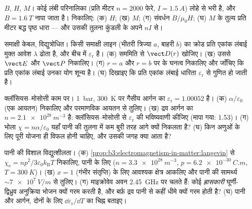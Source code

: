 \begin{exercise}[$\star$]\label{exo:b3:electromagnetism-in-matter:4}
$B$, $H$, $M$। कोई लंबी परिनालिका (प्रति मीटर $n = \num{2000}$ फेरे,
$I = \qty{1.5}{A}$) लोहे से भरी है, और $B = \qty{1.6}{T}$ नापा जाता
है। निकालिए: (क) $H$; (ख) $M$; (ग) संवर्धन
$B/\mu_0H$; (घ) $M$ के तुल्य प्रति मीटर बद्ध पृष्ठ धारा --- और उसकी
तुलना कुंडली के अपने $nI$ से।
\end{exercise}

\begin{exercise}[$\star\star$]\label{exo:b3:electromagnetism-in-matter:5}
समाक्षी केबल, विद्युत्रोधित। किसी समाक्षी लाइन (भीतरी त्रिज्या $a$,
बाहरी $b$) का क्रोड प्रति एकांक लंबाई मुक्त आवेश $\lambda$ ढोता है,
और बीच में  $\varepsilon_{\text{r}}$ है। (क) सममिति से
$\vect D(r)$ खोजिए। (ख) उससे $\vect E$ और $\vect P$ निकालिए।
(ग) $r = a$ और $r = b$ पर  के घनत्व निकालिए और
जाँचिए कि प्रति एकांक लंबाई उनका योग शून्य है। (घ) दिखाइए कि प्रति
एकांक लंबाई धारिता $\varepsilon_{\text{r}}$ से गुणित हो जाती है।
\end{exercise}

\begin{exercise}[$\star\star$]\label{exo:b3:electromagnetism-in-matter:6}
क्लॉसियस--मोसोत्ती काम पर। \qty{1}{bar}, \qty{300}{K} पर गैसीय
आर्गन का $\varepsilon_{\text{r}} = 1.00052$ है। (क)
$\alpha/\varepsilon_0$ (एक आयतन) निकालिए और परमाणविक
आयतन से तुलिए। (ख) द्रव आर्गन का $n = \qty{2.1e28}{m^{-3}}$ है:
क्लॉसियस--मोसोत्ती से $\varepsilon_{\text{r}}$ की भविष्यवाणी कीजिए
(मापा गया: 1.53)। (ग) भोला $\chi = n\alpha/\varepsilon_0$ यहाँ पानी
की तुलना में कम बुरी तरह आगे क्यों निकलता है? (घ) किन अणुओं के लिए
पूरी योजना ही विफल होनी चाहिए, और उसकी जगह क्या आता है?
\end{exercise}

\begin{exercise}[$\star\star$]\label{exo:b3:electromagnetism-in-matter:7}
पानी की विशाल विद्युत्शीलता। (क)
\cref{prop:b3:electromagnetism-in-matter:langevin} से
$\chi_{\text{e}} = np^2/3\varepsilon_0k_{\text{B}}T$ निकालिए, पानी
के लिए ($n = \qty{3.3e28}{m^{-3}}$, $p = \qty{6.2e-30}{C.m}$,
$T = \qty{300}{K}$)। (ख)
$x = 1$ (गंभीर संतृप्ति) के लिए आवश्यक क्षेत्र आकलिए
और पानी की  सामर्थ्य
$\sim\qty{7e7}{V/m}$ से तुलिए। (ग) माइक्रोवेव अवन \qty{2.45}{GHz}
पर चलते हैं: कोई \emph{ह्रासकारी} घूर्णी-द्विध्रुव अनुक्रिया भोजन
क्यों गरम करती है, और बर्फ़ द्रव पानी से कहीं धीमे क्यों गरम होती
है? (घ) पानी और आर्गन, दोनों के लिए
$\dd\varepsilon_{\text{r}}/\dd T$ का चिह्न बताइए।
\end{exercise}

